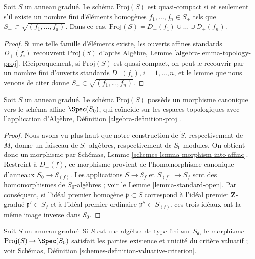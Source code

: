 \begin{lemma}
\label{lemma-proj-quasi-compact}
Soit $S$ un anneau gradué. Le schéma $\text{Proj}(S)$ est quasi-compact si et
seulement s'il existe un nombre fini d'éléments homogènes
$f_1, \ldots, f_n \in S_{+}$ tels que
$S_{+} \subset \sqrt{(f_1, \ldots, f_n)}$. Dans ce cas,
$\text{Proj}(S) = D_+(f_1) \cup \ldots \cup D_+(f_n)$.
\end{lemma}

\begin{proof}
Si une telle famille d'éléments existe, les ouverts affines standards
$D_{+}(f_i)$ recouvrent $\text{Proj}(S)$ d'après Algèbre,
Lemme \ref{algebra-lemma-topology-proj}. Réciproquement, si
$\text{Proj}(S)$ est quasi-compact, on peut le recouvrir par un nombre fini
d'ouverts standards $D_{+}(f_i)$, $i = 1, \ldots, n$, et le lemme que nous
venons de citer donne
$S_{+} \subset \sqrt{(f_1, \ldots, f_n)}$.
\end{proof}

\begin{lemma}
\label{lemma-structure-morphism-proj}
Soit $S$ un anneau gradué. Le schéma $\text{Proj}(S)$ possède un morphisme
canonique vers le schéma affine $\Spec(S_0)$, qui coïncide sur les espaces
topologiques avec l'application d'Algèbre,
Définition \ref{algebra-definition-proj}.
\end{lemma}

\begin{proof}
Nous avons vu plus haut que notre construction de $\widetilde S$, respectivement
de $\widetilde M$, donne un faisceau de $S_0$-algèbres, respectivement de
$S_0$-modules. On obtient donc un morphisme par Schémas,
Lemme \ref{schemes-lemma-morphism-into-affine}. Restreint à $D_{+}(f)$, ce
morphisme provient de l'homomorphisme canonique d'anneaux
$S_0 \to S_{(f)}$. Les applications $S \to S_f$ et $S_{(f)} \to S_f$ sont
des homomorphismes de $S_0$-algèbres ; voir le
Lemme \ref{lemma-standard-open}. Par conséquent, si l'idéal premier homogène
$\mathfrak p \subset S$ correspond à l'idéal premier $\mathbf{Z}$-gradué
$\mathfrak p' \subset S_f$ et à l'idéal premier ordinaire
$\mathfrak p'' \subset S_{(f)}$, ces trois idéaux ont la même image inverse
dans $S_0$.
\end{proof}

\begin{lemma}
\label{lemma-proj-valuative-criterion}
Soit $S$ un anneau gradué. Si $S$ est une algèbre de type fini sur $S_0$,
le morphisme $\text{Proj}(S) \to \Spec(S_0)$ satisfait les parties existence
et unicité du critère valuatif ; voir Schémas,
Définition \ref{schemes-definition-valuative-criterion}.
\end{lemma}

